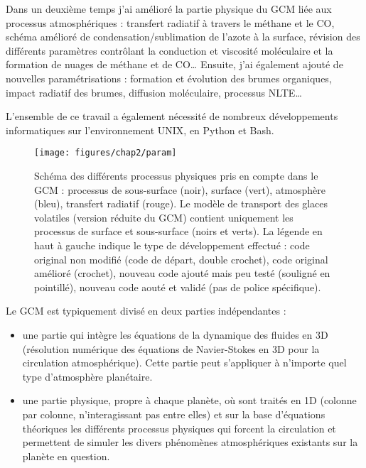
Dans un deuxième temps j’ai amélioré la partie physique du GCM liée aux processus atmosphériques : transfert radiatif à travers le méthane et le CO, schéma amélioré de condensation/sublimation de l’azote à la surface, révision des différents paramètres contrôlant la conduction et viscosité moléculaire et la formation de nuages de méthane et de CO…
Ensuite, j’ai également ajouté de nouvelles paramétrisations : formation et évolution des brumes organiques, impact radiatif des brumes, diffusion moléculaire, processus NLTE…

L’ensemble de ce travail a également nécessité de nombreux développements informatiques sur l’environnement UNIX, en Python et Bash.

\begin{figure}[!h]
\begin{center} 
	\texttt{[image: figures/chap2/param]}
\end{center} 
\caption{Schéma des différents processus physiques pris en compte dans le GCM : processus de sous-surface (noir), surface (vert), atmosphère (bleu), transfert radiatif (rouge). Le modèle de transport des glaces volatiles (version réduite du GCM) contient uniquement les processus  de surface et sous-surface (noirs et verts). La légende en haut à gauche indique le type de développement effectué : code original non modifié (code de départ, double crochet), code original amélioré (crochet), nouveau code ajouté mais peu testé (souligné en pointillé), nouveau code aouté et validé (pas de police spécifique).} 
\label{paramGCM}
\end{figure}

\vspace{0.5cm}

Le GCM est typiquement divisé en deux parties indépendantes :
\begin{itemize}
 \item une partie qui intègre les équations de la dynamique des fluides en 3D (résolution numérique des équations de Navier-Stokes en 3D pour la circulation atmosphérique). Cette partie peut s’appliquer à n’importe quel type d’atmosphère planétaire. 
 \item une partie physique, propre à chaque planète, où sont traités en 1D (colonne par colonne, n’interagissant pas entre elles) et sur la base d’équations théoriques les différents processus physiques qui forcent la circulation et permettent de simuler les divers phénomènes atmosphériques existants sur la planète en question. 
\end{itemize}

